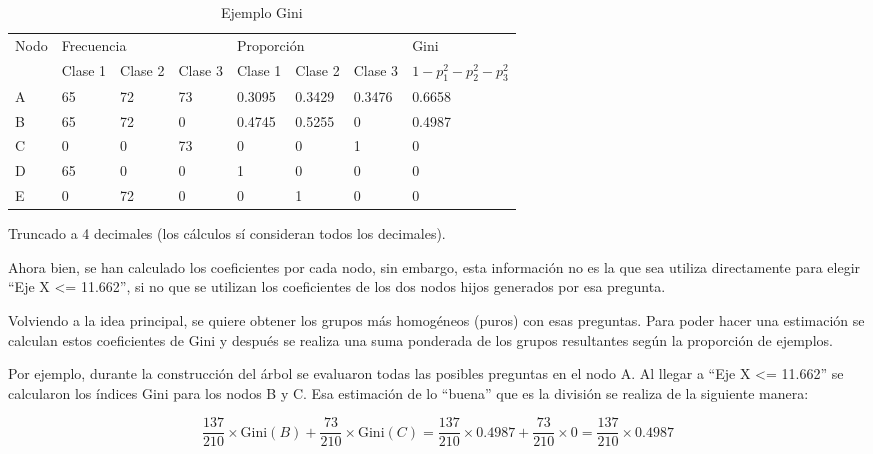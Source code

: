 \begin{table}[H]
\centering
\begin{tabular}{|l|l|l|l|l|l|l|l|}
\hline
\multicolumn{1}{|l|}{\multirow{2}{*}{Nodo}} & \multicolumn{3}{l|}{Frecuencia} & \multicolumn{3}{l|}{Proporción} & \multicolumn{1}{l|}{Gini} \\ \cline{2-8} 
\multicolumn{1}{|l|}{}                  & Clase 1   & Clase 2  & Clase 3  & Clase 1   & Clase 2  & Clase 3  & $1 - p_{1}^{2} - p_{2}^{2} - p_{3}^{2}$                     \\ \hline
A                 & 65        & 72       & 73       & 0.3095    & 0.3429   & 0.3476   & 0.6658                    \\ 
B                 & 65        & 72       & 0        & 0.4745    & 0.5255   & 0        & 0.4987                    \\ 
C                 & 0         & 0        & 73       & 0         & 0        & 1        & 0                         \\ 
D                 & 65        & 0        & 0        & 1         & 0        & 0        & 0                         \\ 
E                 & 0         & 72       & 0        & 0         & 1        & 0        & 0                         \\ \hline
\end{tabular}
\begin{tablenotes}
\footnotesize
\item *Truncado a 4 decimales (los cálculos sí consideran todos los decimales).
\end{tablenotes}
\caption{Ejemplo Gini}
\label{tab:ejemplo_gini}
\end{table}

Ahora bien, se han calculado los coeficientes por cada nodo, sin embargo, esta información no es la que sea utiliza directamente para elegir ``Eje X <= 11.662'', si no que se utilizan los coeficientes de los dos nodos hijos generados por esa pregunta. 

Volviendo a la idea principal, se quiere obtener los grupos más homogéneos (puros) con esas preguntas. Para poder hacer una estimación se calculan estos coeficientes de Gini y después se realiza una suma ponderada de los grupos resultantes según la proporción de ejemplos. 

Por ejemplo, durante la construcción del árbol se evaluaron todas las posibles preguntas en el nodo A. Al llegar a ``Eje X <= 11.662'' se calcularon los índices Gini para los nodos B y C. Esa estimación de lo ``buena'' que es la división se realiza de la siguiente manera:
\vspace{-.75cm}
\begin{center}
    \[\frac{137}{210} \times \text{Gini}(B) +  \frac{73}{210} \times \text{Gini}(C) = \frac{137}{210} \times 0.4987 +  \frac{73}{210} \times 0 = \frac{137}{210} \times 0.4987\] 
\end{center}

